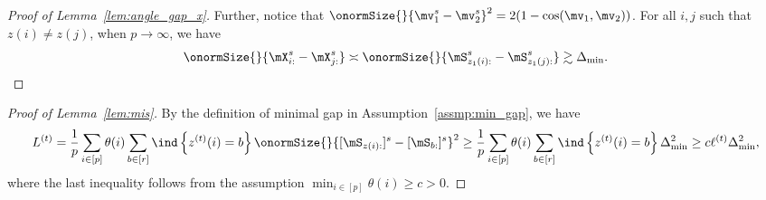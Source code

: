 \documentclass[lettersize,onecolumn,journal]{IEEEtran}
\theoremstyle{definition}
\theoremstyle{definition}
\newcommand{\offf}[1]{\left\{#1\right\}}
\newcommand{\ang}[1]{\left\langle#1\right\rangle}
\begin{document}
{\begin{proof}[Proof of Lemma~\ref{lem:angle_gap_x}]
{{Further, notice that $\onormSize{}{\mv_1^s - \mv_2^s}^2 =  2(1 - \cos(\mv_1, \mv_2))$. For all $i,j$ such that $z(i) \neq z(j)$, when $p \rightarrow \infty$, we have
\begin{equation}
    \onormSize{}{\mX_{i:}^s - \mX_{j:}^s} \asymp \onormSize{}{\mS_{z_1(i):}^s - \mS_{z_1(j):}^s} \gtrsim  \Delta_{\min}.
\end{equation} 


}



}

\end{proof}

\begin{proof}[Proof of Lemma~\ref{lem:mis}]
By the definition of minimal gap in Assumption~\ref{assmp:min_gap}, we have 
\begin{equation}
         L^{(t)} = \frac{1}{p}  \sum_{i \in [p]} \theta(i) \sum_{b \in [r]}  \ind \offf{ z^{(t)}(i) = b } \onormSize{}{ [ \mS_{ z(i):}  ]^s - [ \mS_{b:}  ]^s  }^2 \geq \frac{1}{p}  \sum_{i \in [p]} \theta(i) \sum_{b \in [r]}  \ind \offf{ z^{(t)}(i) = b } \Delta_{\min}^2 \geq c \ell^{(t)} \Delta_{\min}^2,
    \end{equation}
    where the last inequality follows from the assumption $\min_{i \in [p]} \theta(i) \geq c>0$.
\end{proof}


}
\end{document}
